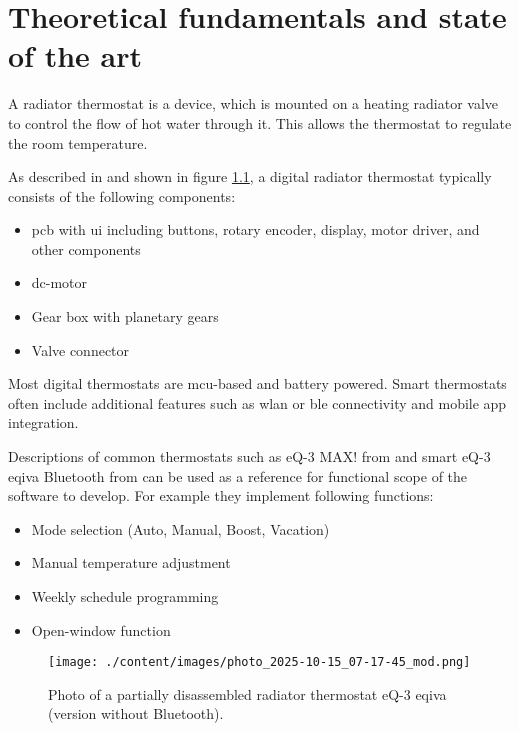 %
%

\chapter{Theoretical fundamentals and state of the art}
\label{chap:Theoretical fundamentals and state of the art}
%
A radiator thermostat is a device, which is mounted on a heating radiator valve to control the flow of hot water through it. This allows the thermostat to regulate the room temperature.

As described in \cite{ELVjournal.2012} and shown in figure \ref{fig:rt-photo}, a digital radiator thermostat typically consists of the following components:

\begin{itemize}
	\item \acs{pcb} with \ac{ui} including buttons, rotary encoder, display, motor driver, and other components
	\item \ac{dc}-motor
	\item Gear box with planetary gears
	\item Valve connector
\end{itemize}

Most digital thermostats are \ac{mcu}-based and battery powered. Smart thermostats often include additional features such as \ac{wlan} or \ac{ble} connectivity and mobile app integration. 

Descriptions of common thermostats such as eQ-3 MAX! from \cite{ELVjournal.2012} and smart eQ-3 eqiva Bluetooth from \cite{eQ3AG.05.2018} can be used as a reference for functional scope of the software to develop. For example they implement following functions:

\begin{itemize}
	\item Mode selection (Auto, Manual, Boost, Vacation)
	\item Manual temperature adjustment
	\item Weekly schedule programming
	\item Open-window function
\end{itemize}

\begin{figure}[htbp]
	\centering
	\texttt{[image: ./content/images/photo\_2025-10-15\_07-17-45\_mod.png]}
	\caption{Photo of a partially disassembled radiator thermostat eQ-3 eqiva (version without Bluetooth).}
	\label{fig:rt-photo}
\end{figure}